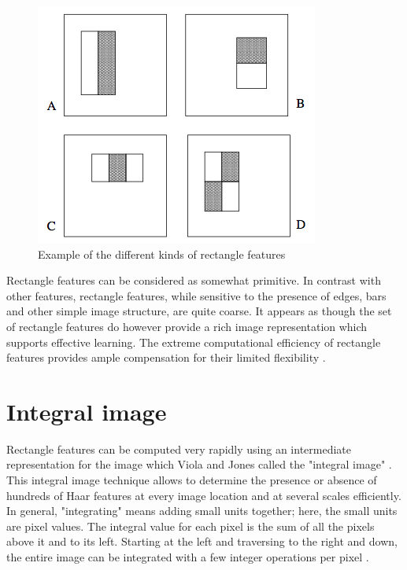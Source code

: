 \begin{figure}[!h]
\begin{center}
\noindent \includegraphics[scale=0.6]{figures/haar_feature_description} 
\newline
\caption{Example of the different kinds of rectangle features}
\label{haar_feature_description}
\end{center} 
\end{figure}

\noindent Rectangle features can be considered as somewhat primitive. In contrast with other features, rectangle features, while sensitive to the presence of edges, bars and other simple image structure, are quite coarse. It appears as though the set of rectangle features do however provide a rich image representation which supports effective learning. The extreme computational efficiency of rectangle features provides ample compensation for their limited flexibility \cite{VIO01}.
\newline

\section{Integral image}

\vspace{\baselineskip}
\noindent Rectangle features can be computed very rapidly using an intermediate representation for the image which Viola and Jones called the "integral image" \cite{VIO01}. This integral image technique allows to determine the presence or absence of hundreds of Haar features at every image location and at several scales efficiently. In general, "integrating" means adding small units together; here, the small units are pixel values. The integral value for each pixel is the sum of all the pixels above it and to its left. Starting at the left and traversing to the right and down, the entire image can be integrated with a few integer operations per pixel \cite{HEW07}.
\newline

